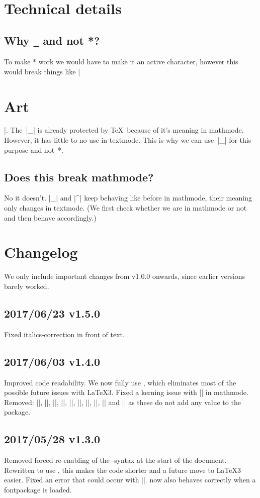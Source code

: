 \documentclass[11pt, cm-default]{l3doc}
\begin{document}
	\section{Technical details}
	\subsection{Why \texttt{\_} and not *?\label{Why?!}}
	To make * work we would have to make it an active character, however this would
	break things like |\section*{Art}|. The~|_| is already protected by \TeX\ because
	of it's meaning in mathmode. However, it has little to no use in textmode. This
	is why we can use~|_| for this purpose and not~*.
	
	\subsection{Does this break mathmode?}
	No it doesn't. |_| and |^| keep behaving like before in mathmode, their meaning
	only changes in textmode. (We first check whether we are in mathmode or not and
	then behave accordingly.)


	\section{Changelog}
	We only include important changes from v1.0.0 onwards, since earlier versions
	barely worked.

	\subsection*{2017/06/23 v1.5.0}
	Fixed italics-correction in front of text.

	\subsection*{2017/06/03 v1.4.0}
	Improved code readability.
	We now fully use , which eliminates most of the possible future
	issues with \LaTeX3. Fixed a kerning issue with |\cir| in mathmode. Removed:
	|\setundact|, |\setundsub|, |\setciract|, |\setcirsup|, |\nrfamily|, |\nrshape|,
	|\nrseries|, |\setffamily|, |\setfshape| and |\setfseries| as these do not add
	any value to the package.

	\subsection*{2017/05/28 v1.3.0}
	Removed forced re-enabling of the -syntax at the start of the
	document. Rewritten to use , this makes the code shorter and a future
	move to \LaTeX3 easier. Fixed an error that could occur with |\cir|.
	 now also behaves correctly when a fontpackage is loaded.
\end{document}
